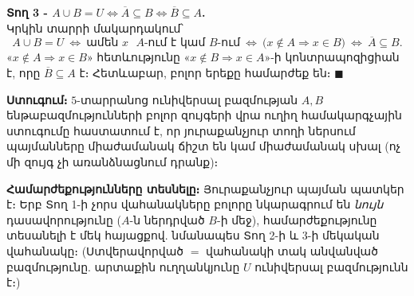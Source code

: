 \documentclass[11pt,a4paper]{article}
\begin{document}
\textbf{Տող 3 - $A\cup B=U\Leftrightarrow \overline{A}\subseteq B\Leftrightarrow \overline{B}\subseteq A$.}\\
Կրկին տարրի մակարդակում՝
$$A\cup B=U
\ \Longleftrightarrow\ \text{ամեն }x\text{ }A\text{-ում է կամ }B\text{-ում}
\ \Longleftrightarrow\ \bigl(x\notin A\Rightarrow x\in B\bigr)
\ \Longleftrightarrow\ \overline{A}\subseteq B.$$
«$x\notin A\Rightarrow x\in B$» հետևությունը «$x\notin B\Rightarrow x\in A$»-ի կոնտրապոզիցիան է, որը
$\overline{B}\subseteq A$ է։ Հետևաբար, բոլոր երեքը համարժեք են։ $\blacksquare$

\textbf{Ստուգում։} $5$-տարրանոց ունիվերսալ բազմության $A,B$ ենթաբազմությունների բոլոր զույգերի վրա ուղիղ
համակարգչային ստուգումը հաստատում է, որ յուրաքանչյուր տողի ներսում պայմանները միաժամանակ ճիշտ են կամ
միաժամանակ սխալ (ոչ մի զույգ չի առանձնացնում դրանք)։ \checkmark

\textbf{Համարժեքությունները տեսնելը։} Յուրաքանչյուր պայման պատկեր է։ Երբ Տող 1-ի չորս վահանակները բոլորը
նկարագրում են \emph{նույն} դասավորությունը ($A$-ն ներդրված $B$-ի մեջ), համարժեքությունը տեսանելի է մեկ
հայացքով. նմանապես Տող 2-ի և 3-ի մեկական վահանակը։ (Ստվերավորված $=$ վահանակի տակ անվանված բազմությունը.
արտաքին ուղղանկյունը $U$ ունիվերսալ բազմությունն է։)
\end{document}
